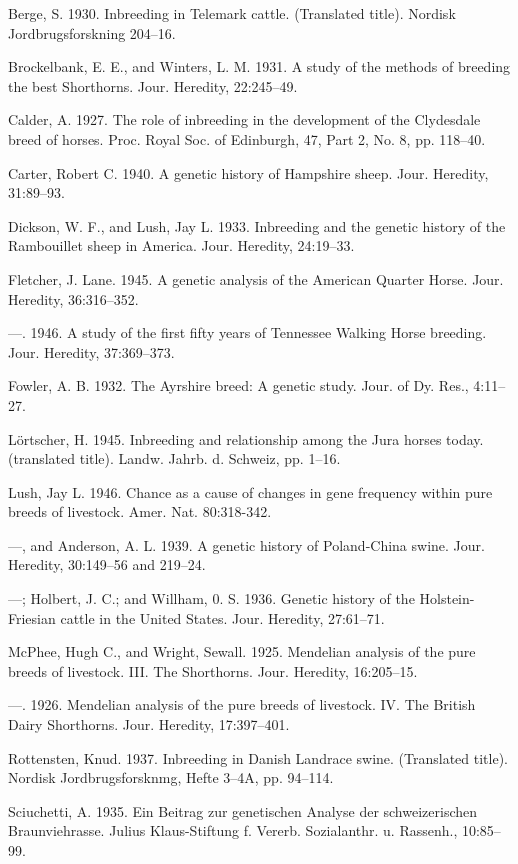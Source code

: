 \begin{hangparas}{0.5in}{1}%
Berge, S. 1930. Inbreeding in Telemark cattle. (Translated title). Nordisk Jordbrugsforskning
204--16.

Brockelbank, E. E., and Winters, L. M. 1931. A study of the methods of breeding the
best Shorthorns. Jour. Heredity, 22:245--49.

Calder, A. 1927. The role of inbreeding in the development of the Clydesdale breed
of horses. Proc. Royal Soc. of Edinburgh, 47, Part 2, No. 8, pp. 118--40.

Carter, Robert C. 1940. A genetic history of Hampshire sheep. Jour. Heredity,
31:89--93.

Dickson, W. F., and Lush, Jay L. 1933. Inbreeding and the genetic history of the
Rambouillet sheep in America. Jour. Heredity, 24:19--33.

Fletcher, J. Lane. 1945. A genetic analysis of the American Quarter Horse. Jour.
Heredity, 36:316--352.

---. 1946. A study of the first fifty years of Tennessee Walking Horse breeding.
Jour. Heredity, 37:369--373.

Fowler, A. B. 1932. The Ayrshire breed: A genetic study. Jour. of Dy. Res., 4:11--27.

L\"ortscher, H. 1945. Inbreeding and relationship among the Jura horses today.
(translated title). Landw. Jahrb. d. Schweiz, pp. 1--16.

Lush, Jay L. 1946. Chance as a cause of changes in gene frequency within pure
breeds of livestock. Amer. Nat. 80:318-342.

---, and Anderson, A. L. 1939. A genetic history of Poland-China swine.
Jour. Heredity, 30:149--56 and 219--24.

---; Holbert, J. C.; and Willham, 0. S. 1936. Genetic history of the Holstein-
Friesian cattle in the United States. Jour. Heredity, 27:61--71.

McPhee, Hugh C., and Wright, Sewall. 1925. Mendelian analysis of the pure breeds
of livestock. III. The Shorthorns. Jour. Heredity, 16:205--15.

---. 1926. Mendelian analysis of the pure breeds of livestock. IV. The British
Dairy Shorthorns. Jour. Heredity, 17:397--401.

Rottensten, Knud. 1937. Inbreeding in Danish Landrace swine. (Translated title).
Nordisk Jordbrugsforsknmg, Hefte 3--4A, pp. 94--114.

Sciuchetti, A. 1935. Ein Beitrag zur genetischen Analyse der schweizerischen Braunviehrasse.
Julius Klaus-Stiftung f. Vererb. Sozialanthr. u. Rassenh., 10:85--99.


\end{hangparas}
